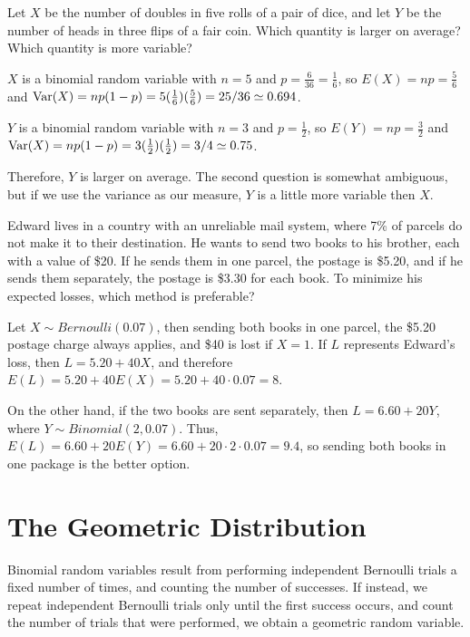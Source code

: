 \begin{examp} Let $X$ be the number of doubles in five rolls of a pair of dice, and let $Y$ be the number of heads in three flips of a fair coin. Which quantity is larger on average? Which quantity is more variable?
\par
\noindent $X$ is a binomial random variable with $n = 5$ and $p = \frac{6}{36} = \frac{1}{6}$, so $E(X) = np = \frac{5}{6}$ and $\operatorname{Var}(X) = np(1-p) = 5(\frac{1}{6})(\frac{5}{6}) = 25/36 \simeq 0.694$.
\par
\noindent $Y$ is a binomial random variable with $n = 3$ and $p = \frac{1}{2}$, so $E(Y) = np = \frac{3}{2}$ and $\operatorname{Var}(X) = np(1-p) = 3(\frac{1}{2})(\frac{1}{2}) = 3/4 \simeq 0.75$.
\par
\noindent Therefore, $Y$ is larger on average. The second question is somewhat ambiguous, but if we use the variance as our measure, $Y$ is a little more variable then $X$.
\end{examp}

\begin{examp}Edward lives in a country with an unreliable mail system, where 7\% of parcels do not make it to their destination. He wants to send two books to his brother, each with a value of \$20. If he sends them in one parcel, the postage is \$5.20, and if he sends them separately, the postage is \$3.30 for each book. To minimize his expected losses, which method is preferable?
\par
\noindent Let $X \sim Bernoulli(0.07)$, then sending both books in one parcel, the \$5.20 postage charge always applies, and \$40 is lost if $X = 1$. If $L$ represents Edward's loss, then $L = 5.20 + 40X$, and therefore $E(L) = 5.20 + 40E(X) = 5.20 + 40 \cdot 0.07 = 8$.
\par
\noindent On the other hand, if the two books are sent separately, then $L = 6.60 + 20Y$, where $Y \sim Binomial(2,0.07)$. Thus, $E(L) = 6.60 + 20E(Y) = 6.60 + 20 \cdot 2 \cdot 0.07 = 9.4$, so sending both books in one package is the better option.


\end{examp}

\section{The Geometric Distribution}\label{GeometricDist}

Binomial random variables result from performing independent Bernoulli trials a fixed number of times, and counting the number of successes. If instead, we repeat independent Bernoulli trials only until the first success occurs, and count the number of trials that were performed, we obtain a geometric random variable.


